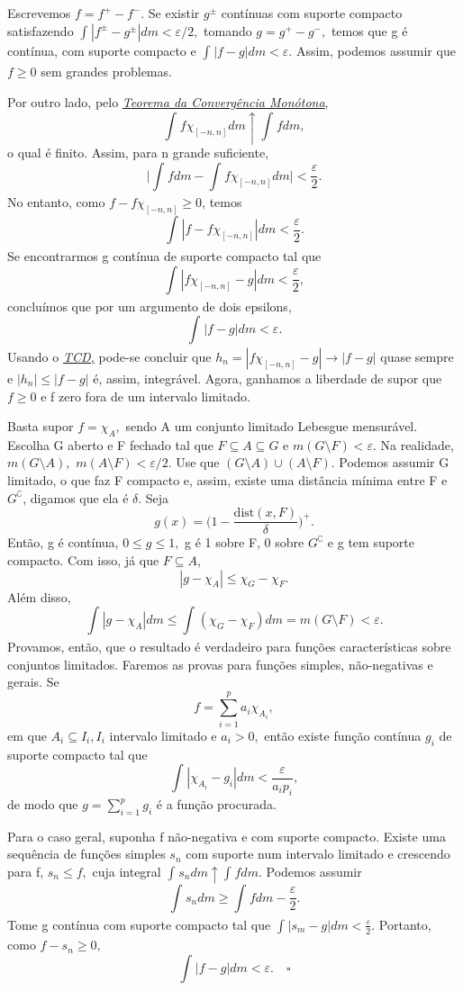 \documentclass[measure_theory.tex]{subfiles}
\begin{document}
\begin{proof*}
	Escrevemos \(f = f^{+} - f^{-}.\) Se existir \(g^{\pm} \) contínuas com suporte compacto satisfazendo \(\int_{}|f^{\pm} - g^{\pm}| dm < \varepsilon /2,\)
	tomando \(g = g^{+} - g^{-},\) temos que g é contínua, com suporte compacto e \(\int_{}|f-g| dm < \varepsilon .\) Assim, podemos assumir que \(f\geq 0\) sem grandes problemas.

	Por outro lado, pelo \hyperlink{monotone_convergence}{\textit{Teorema da Convergência Monótona}},
	\[
		\int_{}f \chi_{[-n, n]} dm \uparrow \int_{}f dm,
	\]
	o qual é finito. Assim, para n grande suficiente,
	\[
		\biggl\vert \int_{}f dm - \int_{}f \chi_{[-n, n]} dm \biggr\vert < \frac{\varepsilon }{2}.
	\]
	No entanto, como \(f - f \chi_{[-n, n]} \geq 0\), temos
	\[
		\int_{}|f - f \chi_{[-n, n]}| dm < \frac{\varepsilon }{2}.
	\]
	Se encontrarmos g contínua de suporte compacto tal que
	\[
		\int_{}|f \chi_{[-n, n]} - g| dm < \frac{\varepsilon }{2},
	\]
	concluímos que por um argumento de dois epsilons,
	\[
		\int_{}|f-g| dm < \varepsilon.
	\]
	Usando o \hyperlink{monotone_convergence}{\textit{TCD,}} pode-se concluir que \(h_{n} = |f \chi_{[-n, n]} - g|\to |f-g|\) quase sempre e \(|h_{n}| \leq |f-g|\) é, assim, integrável. Agora, ganhamos a liberdade de supor que \(f \geq 0\) e
	f zero fora de um intervalo limitado.

	Basta supor \(f=\chi_{A},\) sendo A um conjunto limitado Lebesgue mensurável. Escolha G aberto e F fechado tal que \(F\subseteq A\subseteq G\) e \(m(G\setminus{F}) < \varepsilon.\) Na realidade,
	\(m(G\setminus{A}),\) \(m(A\setminus{F}) < \varepsilon /2.\) Use que \((G\setminus{A})\cup (A\setminus{F}).\) Podemos assumir G limitado, o que faz F compacto e, assim, existe uma distância mínima entre F e \(G^{\complement}\), digamos que ela é \(\delta \). Seja
	\[
		g(x) = \biggl(1 - \frac{\mathrm{dist}(x, F)}{\delta }\biggr)^{+}.
	\]
	Então, g é contínua, \(0\leq g \leq 1, \) g é 1 sobre F, 0 sobre \(G ^{\complement}\) e g tem suporte compacto. Com isso, já que \(F\subseteq A\),
	\[
		|g- \chi_{A}|\leq \chi_{G} - \chi_{F}.
	\]
	Além disso,
	\[
		\int_{}|g-\chi_{A}| dm \leq \int_{}(\chi_{G} - \chi_{F}) dm = m(G\setminus{F})<\varepsilon .
	\]
	Provamos, então, que o resultado é verdadeiro para funções características sobre conjuntos limitados. Faremos as provas para funções simples, não-negativas e gerais. Se
	\[
		f= \sum\limits_{i=1}^{p}a_{i}\chi_{A_{i}},
	\]
	em que \(A_{i}\subseteq I_{i}, I_{i}\) intervalo limitado e \(a_{i} > 0,\) então existe função contínua \(g_{i}\) de suporte compacto tal que
	\[
		\int_{}|\chi_{A_{i}} - g_{i}| dm < \frac{\varepsilon }{a_{i}p_{i}},
	\]
	de modo que \(g=\sum\limits_{i=1}^{p}g_{i}\) é a função procurada.

	Para o caso geral, suponha f não-negativa e com suporte compacto. Existe uma sequência de funções simples \(s_{n}\) com suporte num intervalo limitado e crescendo
	para f, \(s_{n}\leq f,\) cuja integral \(\int_{}s_{n} dm \uparrow \int_{}f dm.\) Podemos assumir
	\[
		\int_{}s_{n} dm \geq \int_{}f dm - \frac{\varepsilon }{2}.
	\]
	Tome g contínua com suporte compacto tal que \(\int_{}|s_{m} - g| dm < \frac{\varepsilon }{2}.\) Portanto, como \(f - s_{n}\geq 0,\)
	\[
		\int_{}|f-g| dm < \varepsilon .\quad \square
	\]
\end{proof*}
\end{document}
